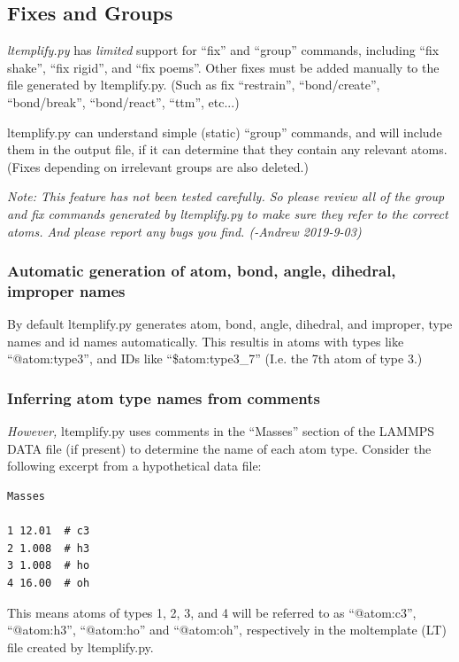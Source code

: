 \documentclass[11pt]{article}
\begin{document}
\subsection{Fixes and Groups}
\label{sec:ltemplify_fix_group}

\textit{ltemplify.py} has
\textit{limited} support for ``fix'' and ``group'' commands,
including ``fix shake'', ``fix rigid'', and ``fix poems''.
Other fixes must be added manually to the file generated by ltemplify.py.
(Such as fix ``restrain'', ``bond/create'', ``bond/break'', ``bond/react'',
 ``ttm'', etc...)

ltemplify.py can understand simple (static) ``group'' commands, and will include them in the output file, if it can determine that they contain any relevant atoms.  (Fixes depending on irrelevant groups are also deleted.)

\textit{Note: This feature has not been tested carefully.  So please review all of the group and fix commands generated by ltemplify.py to make sure they refer to the correct atoms.  And please report any bugs you find. (-Andrew 2019-9-03)}



\subsubsection*{Automatic generation of atom, bond, angle, dihedral, improper names}

By default ltemplify.py generates atom, bond, angle, dihedral, and improper,
type names and id names automatically.
This resultis in atoms with types like ``@atom:type3'', and IDs like
``\$atom:type3\_7'' (I.e. the 7th atom of type 3.)

\subsubsection*{ Inferring atom type names from comments }

\textit{However,} ltemplify.py uses comments in the ``Masses'' section of
the LAMMPS DATA file (if present) to determine the name
of each atom type.
Consider the following excerpt from a hypothetical data file:
\begin{verbatim}
Masses

1 12.01  # c3
2 1.008  # h3
3 1.008  # ho
4 16.00  # oh
\end{verbatim}
This means atoms of types 1, 2, 3, and 4 will be referred to as
``@atom:c3'', ``@atom:h3'', ``@atom:ho'' and ``@atom:oh'',
respectively in the moltemplate (LT) file created by ltemplify.py.
\end{document}
